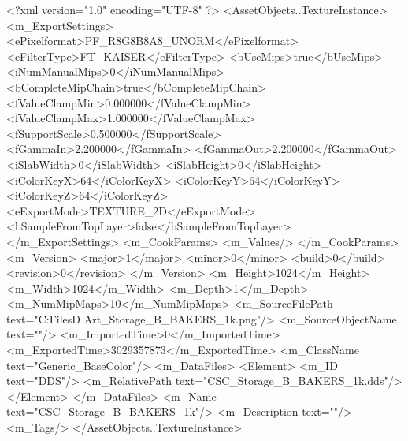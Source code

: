 <?xml version="1.0" encoding="UTF-8" ?>
<AssetObjects..TextureInstance>
	<m_ExportSettings>
		<ePixelformat>PF_R8G8B8A8_UNORM</ePixelformat>
		<eFilterType>FT_KAISER</eFilterType>
		<bUseMips>true</bUseMips>
		<iNumManualMips>0</iNumManualMips>
		<bCompleteMipChain>true</bCompleteMipChain>
		<fValueClampMin>0.000000</fValueClampMin>
		<fValueClampMax>1.000000</fValueClampMax>
		<fSupportScale>0.500000</fSupportScale>
		<fGammaIn>2.200000</fGammaIn>
		<fGammaOut>2.200000</fGammaOut>
		<iSlabWidth>0</iSlabWidth>
		<iSlabHeight>0</iSlabHeight>
		<iColorKeyX>64</iColorKeyX>
		<iColorKeyY>64</iColorKeyY>
		<iColorKeyZ>64</iColorKeyZ>
		<eExportMode>TEXTURE_2D</eExportMode>
		<bSampleFromTopLayer>false</bSampleFromTopLayer>
	</m_ExportSettings>
	<m_CookParams>
		<m_Values/>
	</m_CookParams>
	<m_Version>
		<major>1</major>
		<minor>0</minor>
		<build>0</build>
		<revision>0</revision>
	</m_Version>
	<m_Height>1024</m_Height>
	<m_Width>1024</m_Width>
	<m_Depth>1</m_Depth>
	<m_NumMipMaps>10</m_NumMipMaps>
	<m_SourceFilePath text="C:\Users\Shadow\Desktop\Working Files\3D Art\Textures\CSC_Storage_B_BAKERS_1k.png"/>
	<m_SourceObjectName text=""/>
	<m_ImportedTime>0</m_ImportedTime>
	<m_ExportedTime>3029357873</m_ExportedTime>
	<m_ClassName text="Generic_BaseColor"/>
	<m_DataFiles>
		<Element>
			<m_ID text="DDS"/>
			<m_RelativePath text="CSC_Storage_B_BAKERS_1k.dds"/>
		</Element>
	</m_DataFiles>
	<m_Name text="CSC_Storage_B_BAKERS_1k"/>
	<m_Description text=""/>
	<m_Tags/>
</AssetObjects..TextureInstance>

